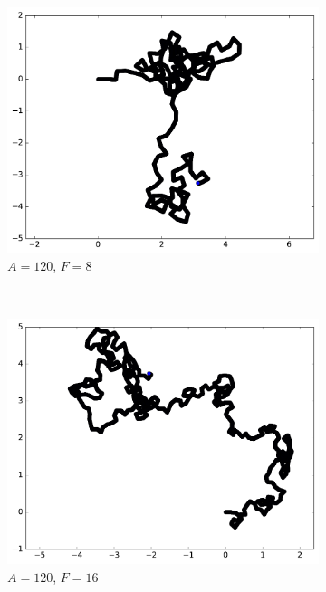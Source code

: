 \begin{appendices}
\begin{figure}[htbp]
\begin{subfigure}[t]{\subImgWmo}
			\includegraphics[width=\textwidth]{figures/ch3/synTraj_219_120_8}
			\caption[$A = 120$, $F=8$]{$A = 120$, $F=8$}
			\label{fig:synTraj_219_120_8}
		\end{subfigure}
		~
		\begin{subfigure}[t]{\subImgWmo}
			\centering
			\includegraphics[width=\textwidth]{figures/ch3/synTraj_219_120_16}
			\caption[$A = 120$, $F=16$]{$A = 120$, $F=16$}
			\label{fig:synTraj_219_120_16}
		\end{subfigure}
		~
		\begin{subfigure}[t]{\subImgWmo}
			\centering

\end{subfigure}
\end{figure}
\end{appendices}
